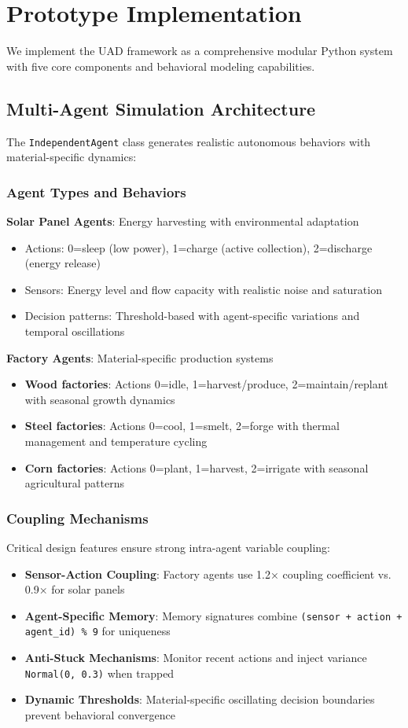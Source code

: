 \documentclass[10pt,conference]{IEEEtran}
\begin{document}
\section{Prototype Implementation}
We implement the UAD framework as a comprehensive modular Python system with five core components and behavioral modeling capabilities.

\subsection{Multi-Agent Simulation Architecture}
The \texttt{IndependentAgent} class generates realistic autonomous behaviors with material-specific dynamics:

\subsubsection{Agent Types and Behaviors}
\textbf{Solar Panel Agents}: Energy harvesting with environmental adaptation
\begin{itemize}
  \item Actions: 0=sleep (low power), 1=charge (active collection), 2=discharge (energy release)
  \item Sensors: Energy level and flow capacity with realistic noise and saturation
  \item Decision patterns: Threshold-based with agent-specific variations and temporal oscillations
\end{itemize}

\textbf{Factory Agents}: Material-specific production systems
\begin{itemize}
  \item \textbf{Wood factories}: Actions 0=idle, 1=harvest/produce, 2=maintain/replant with seasonal growth dynamics
  \item \textbf{Steel factories}: Actions 0=cool, 1=smelt, 2=forge with thermal management and temperature cycling
  \item \textbf{Corn factories}: Actions 0=plant, 1=harvest, 2=irrigate with seasonal agricultural patterns
\end{itemize}

\subsubsection{Coupling Mechanisms}
Critical design features ensure strong intra-agent variable coupling:
\begin{itemize}
  \item \textbf{Sensor-Action Coupling}: Factory agents use 1.2× coupling coefficient vs. 0.9× for solar panels
  \item \textbf{Agent-Specific Memory}: Memory signatures combine \texttt{(sensor + action + agent\_id) \% 9} for uniqueness
  \item \textbf{Anti-Stuck Mechanisms}: Monitor recent actions and inject variance \texttt{Normal(0, 0.3)} when trapped
  \item \textbf{Dynamic Thresholds}: Material-specific oscillating decision boundaries prevent behavioral convergence
\end{itemize}
\end{document}
